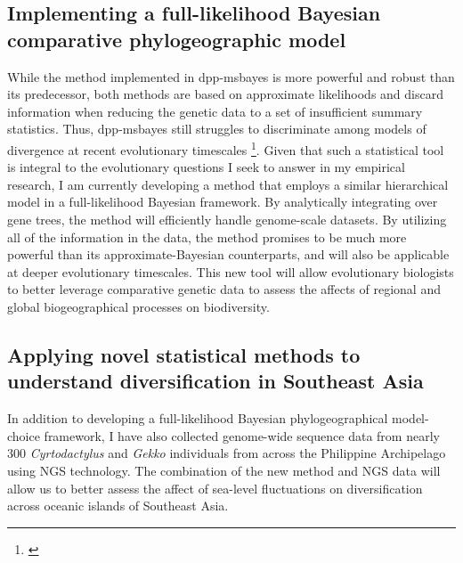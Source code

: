 \subsection*{Implementing a full-likelihood Bayesian comparative
    phylogeographic model}
While the method implemented in dpp-msbayes is more powerful and robust than
its predecessor, both methods are based on approximate likelihoods and discard
information when reducing the genetic data to a set of insufficient summary
statistics.
Thus, dpp-msbayes still struggles to discriminate among models of divergence at
recent evolutionary timescales \footnote{\label{Oaks14dpp}}.
Given that such a statistical tool is integral to the evolutionary questions
I seek to answer in my empirical research,
I am currently developing a method that employs a similar hierarchical model in
a full-likelihood Bayesian framework.
By analytically integrating over gene trees, the method will efficiently handle
genome-scale datasets.
By utilizing all of the information in the data, the method promises to be much
more powerful than its approximate-Bayesian counterparts, and will also be
applicable at deeper evolutionary timescales.
This new tool will allow evolutionary biologists to better leverage comparative
genetic data to assess the affects of regional and global biogeographical
processes on biodiversity.

\subsection*{Applying novel statistical methods to understand diversification
    in Southeast Asia}
In addition to developing a full-likelihood Bayesian phylogeographical
model-choice framework, I have also collected genome-wide sequence data from
nearly 300 \emph{Cyrtodactylus} and \emph{Gekko} individuals from across the
Philippine Archipelago using NGS technology.
The combination of the new method and NGS data will allow us to better assess
the affect of sea-level fluctuations on diversification across oceanic islands
of Southeast Asia.

